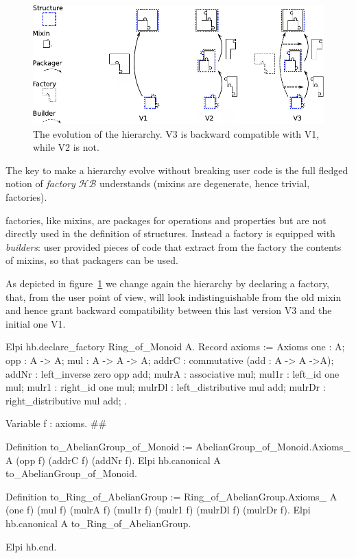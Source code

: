 \documentclass[a4paper,UKenglish,cleveref, autoref]{lipics-v2019}
\newcommand{\HB}{\ensuremath{\mathcal{HB}}}
\newcommand{\mixin}{mixin}
\newcommand{\mixins}{mixins}
\newcommand{\factory}{factory}
\newcommand{\factories}{factories}
\newcommand{\packager}{packager}
\newcommand{\builder}{builder}
\theoremstyle{implem}
\theoremstyle{implem}
\theoremstyle{axiom}
\theoremstyle{abscommand}
\theoremstyle{command}
\begin{document}
\begin{figure}[!h]
  \begin{center}
    \includegraphics[width=\textwidth]{puzzle.pdf}
  \end{center}
  \caption{\label{fig:puzzle}The evolution of the hierarchy. V3 is backward compatible with V1, while V2 is not.}
\end{figure}

The key to make a hierarchy evolve without breaking user code is the full
fledged notion of \emph{\factory{}} \HB{} understands (\mixins{} are degenerate,
hence trivial, factories).

\factories{}, like \mixins{}, are packages for operations and properties but are
not directly used in the definition of structures. Instead a \factory{} is
equipped with \emph{\builder{}s}: user provided pieces of code that extract
from the \factory{} the contents of \mixins{}, so that \packager{}s can be used.

As depicted in figure~\ref{fig:puzzle} we change again the hierarchy
by declaring a  \factory{}, that, from the user point of view,
will look indistinguishable from the old  \mixin{}
and hence grant backward compatibility between this last version V3 and the
initial one V1.

\begin{coqcode}
Elpi hb.declare_factory Ring_of_Monoid A.
  Record axioms := Axioms {
    one : A;
    opp : A -> A;
    mul : A -> A -> A;
    addrC : commutative (add : A -> A ->A);
    addNr : left_inverse zero opp add;
    mulrA : associative mul;
    mul1r : left_id one mul;
    mulr1 : right_id one mul;
    mulrDl : left_distributive mul add;
    mulrDr : right_distributive mul add;
  }.

  Variable f : axioms.                                                          #\label{demo3:variable:f}#

  Definition to_AbelianGroup_of_Monoid :=
    AbelianGroup_of_Monoid.Axioms_ A (opp f) (addrC f) (addNr f).
  Elpi hb.canonical A to_AbelianGroup_of_Monoid.

  Definition to_Ring_of_AbelianGroup :=
    Ring_of_AbelianGroup.Axioms_ A (one f) (mul f)
      (mulrA f) (mul1r f) (mulr1 f) (mulrDl f) (mulrDr f).
  Elpi hb.canonical A to_Ring_of_AbelianGroup.

Elpi hb.end.
\end{coqcode}
\end{document}

